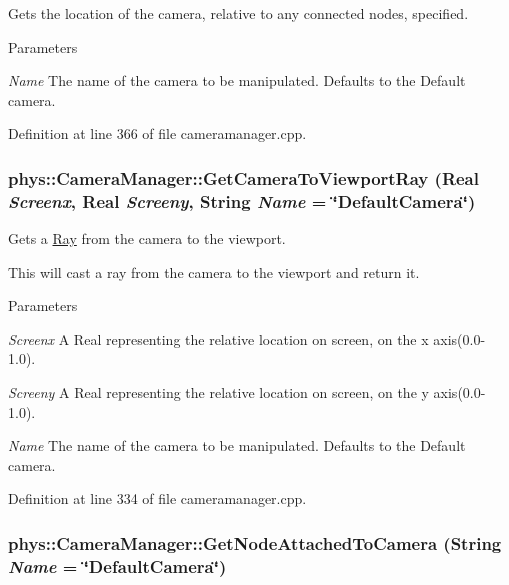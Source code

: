 Gets the location of the camera, relative to any connected nodes, specified. 
\begin{DoxyParams}{Parameters}
\item[{\em Name}]The name of the camera to be manipulated. Defaults to the Default camera. \end{DoxyParams}


Definition at line 366 of file cameramanager.cpp.

\hypertarget{classphys_1_1CameraManager_a1a631eee22a0e45e2e72727d0bcc3560}{
\subsubsection[{GetCameraToViewportRay}]{ phys::CameraManager::GetCameraToViewportRay ({\bf Real} {\em Screenx}, \/  {\bf Real} {\em Screeny}, \/  {\bf String} {\em Name} = {\ttfamily \char`\"{}DefaultCamera\char`\"{}})}}
\label{d9/d91/classphys_1_1CameraManager_a1a631eee22a0e45e2e72727d0bcc3560}


Gets a \hyperlink{classphys_1_1Ray}{Ray} from the camera to the viewport. 

This will cast a ray from the camera to the viewport and return it. 
\begin{DoxyParams}{Parameters}
\item[{\em Screenx}]A Real representing the relative location on screen, on the x axis(0.0-\/1.0). \item[{\em Screeny}]A Real representing the relative location on screen, on the y axis(0.0-\/1.0). \item[{\em Name}]The name of the camera to be manipulated. Defaults to the Default camera. \end{DoxyParams}


Definition at line 334 of file cameramanager.cpp.

\hypertarget{classphys_1_1CameraManager_a52a62fcfbeed45a2f527f626731ddcc1}{
\subsubsection[{GetNodeAttachedToCamera}]{ phys::CameraManager::GetNodeAttachedToCamera ({\bf String} {\em Name} = {\ttfamily \char`\"{}DefaultCamera\char`\"{}})}}
\label{d9/d91/classphys_1_1CameraManager_a52a62fcfbeed45a2f527f626731ddcc1}


